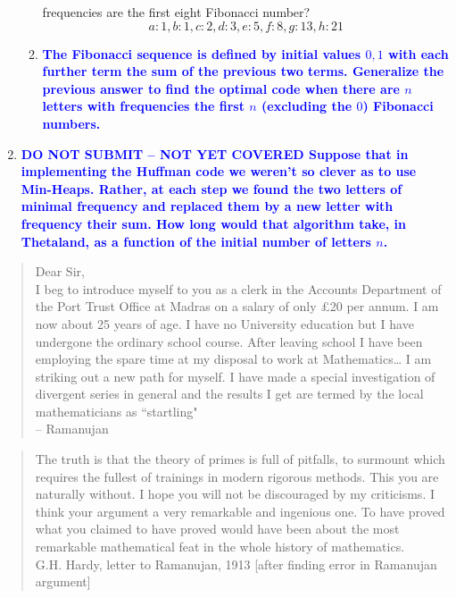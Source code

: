 \documentclass[11pt]{article}
\begin{document}
\begin{enumerate}
\begin{enumerate}
{{    frequencies are the first eight Fibonacci number?
    \[ a:1, b:1, c:2, d:3, e:5, f:8, g:13, h:21  \]}}
    \item \textbf{\textcolor{blue}{The Fibonacci sequence is defined by initial values $0,1$ 
    with each further term the sum of the previous two terms.  Generalize
    the previous answer to find the optimal code when there are $n$ letters with
    frequencies the first $n$ (excluding the $0$) Fibonacci numbers.}}
    \end{enumerate}
\item \textbf{\textcolor{blue}{{\bf DO NOT SUBMIT -- NOT YET COVERED} 
Suppose that in implementing the Huffman code we weren't
so clever as to use Min-Heaps.  Rather, at each step we found
the two letters of minimal frequency and replaced them by
a new letter with frequency their sum.  How long would that
algorithm take, in Thetaland, as a function of the initial number of
letters $n$.}}
\end{enumerate}


\begin{quote}
Dear Sir,
\\  I beg to introduce myself to you as a clerk in the Accounts Department
of the Port Trust Office at Madras on a salary of only \pounds 20 per
annum.  I am now about 25 years of age.  I have no University education but
I have undergone the ordinary school course.  After leaving school I have
been employing the spare time at my disposal to work at Mathematics\ldots
I am striking out a new path for myself.  I have made a special investigation
of divergent series in general and the results I get are termed
by the local mathematicians as ``startling"  \\ -- Ramanujan

\end{quote}

\begin{quote}
The truth is that the theory of primes is full of pitfalls, to surmount which requires the 
fullest of trainings in modern rigorous methods. This you are naturally without. I hope 
you will not be discouraged by my criticisms. I think your argument a very remarkable 
and ingenious one. To have proved what you claimed to have proved would have been
 about the most remarkable mathematical feat in the whole history of mathematics.
\\ G.H. Hardy, letter to Ramanujan, 1913 [after finding error in Ramanujan argument]
\end{quote}
\end{document}
